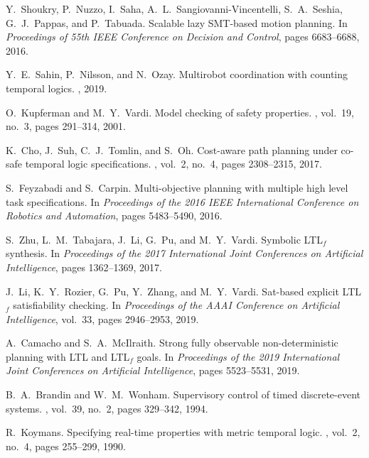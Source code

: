 \documentclass{article}
\begin{document}
\begin{thebibliography}{99}
%
Y.~Shoukry, P.~Nuzzo, I.~Saha, A.~L.~Sangiovanni-Vincentelli, S.~A.~Seshia, G.~J.~Pappas, and P.~Tabuada.
\newblock Scalable lazy SMT-based motion planning.
\newblock In {\em Proceedings of 55th IEEE Conference on Decision and Control}, pages 6683--6688, 2016.

%
Y.~E.~Sahin, P.~Nilsson, and N.~Ozay.
\newblock Multirobot coordination with counting temporal logics.
, 2019.

%
O.~Kupferman and M.~Y.~Vardi.
\newblock Model checking of safety properties.
, vol.~19, no.~3, pages 291--314, 2001.

%
K.~Cho, J.~Suh, C.~J.~Tomlin, and S.~Oh.
\newblock Cost-aware path planning under co-safe temporal logic specifications.
, vol.~2, no.~4, pages 2308--2315, 2017.

%
S.~Feyzabadi and S.~Carpin.
\newblock Multi-objective planning with multiple high level task specifications.
\newblock In {\em Proceedings of the 2016 IEEE International Conference on Robotics and Automation}, pages 5483--5490, 2016.

%
S.~Zhu, L.~M.~Tabajara, J.~Li, G.~Pu, and M.~Y.~Vardi.
\newblock Symbolic LTL$_f$ synthesis.
\newblock In {\em  Proceedings of the 2017 International Joint Conferences on Artificial Intelligence}, pages 1362--1369, 2017.

%
J.~Li, K.~Y.~Rozier, G.~Pu, Y.~Zhang, and M.~Y.~Vardi.
\newblock Sat-based explicit LTL$_f$ satisfiability checking.
\newblock In {\em Proceedings of the AAAI Conference on Artificial Intelligence}, vol.~33, pages 2946--2953, 2019.

%
A.~Camacho and S.~A.~McIlraith.
\newblock Strong fully observable non-deterministic planning with LTL and LTL$_f$ goals.
\newblock In {\em Proceedings of the 2019 International Joint Conferences on Artificial Intelligence}, pages 5523--5531, 2019.

%
B.~A.~{Brandin} and W.~M.~{Wonham}.
\newblock Supervisory control of timed discrete-event systems.
, vol.~39, no.~2, pages 329--342, 1994.

%
R.~Koymans.
\newblock Specifying real-time properties with metric temporal logic.
, vol.~2, no.~4, pages 255--299, 1990.


\end{thebibliography}
\end{document}
